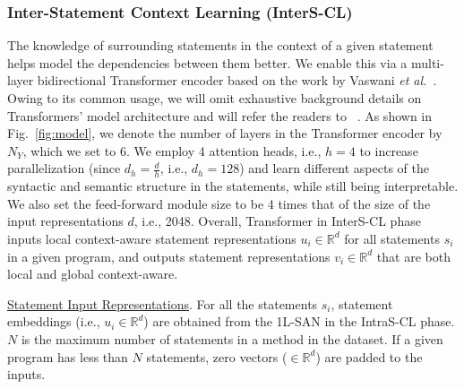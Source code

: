 \vspace{2pt}
\subsubsection{\bf Inter-Statement Context Learning (InterS-CL)}
The knowledge of surrounding statements in the context of a given
statement helps \tool model the dependencies between them better. We
enable this via a multi-layer bidirectional Transformer encoder based
on the work by Vaswani {\em et
  al.}~\cite{Vaswani-2017}. Owing to its common usage, we will omit
exhaustive background details on Transformers' model architecture and
will refer the readers to ~\cite{Vaswani-2017}. As shown in
Fig.~\ref{fig:model}, we denote the number of layers in the
Transformer encoder by $N_Y$, which we set to 6. We employ 4 attention
heads, i.e., $h$$=$$4$ to increase parallelization (since
$d_h$$=$$\frac{d}{h}$, i.e., $d_h$$=$$128$) and learn different
aspects of the syntactic and semantic structure in the statements,
while still being interpretable. We also set the feed-forward module
size to be 4 times that of the size of the input representations $d$,
i.e., 2048. Overall, Transformer in InterS-CL phase inputs
local context-aware statement representations $u_i \in \mathbb{R}^d$
for all statements $s_i$ in a given program, and outputs statement
representations $v_i \in \mathbb{R}^d$ that are both local and global
context-aware.

\vspace{1pt} \underline{Statement Input Representations}. For all the
statements $s_i$, statement embeddings (i.e., $u_i \in
\mathbb{R}^d$) are obtained from the 1L-SAN in the IntraS-CL phase.
$N$ is the maximum number of statements in a method in the dataset. If
a given program has less than $N$ statements,
zero vectors ($\in \mathbb{R}^d$) are padded to the inputs.



